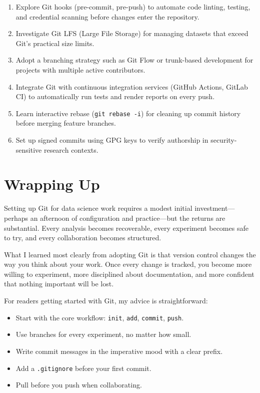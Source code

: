 \documentclass[
  letterpaper,
  DIV=11,
  numbers=noendperiod]{scrartcl}
\providecommand{\tightlist}{%
  \setlength{\itemsep}{0pt}\setlength{\parskip}{0pt}}
\begin{document}
\begin{enumerate}
\def\labelenumi{\arabic{enumi}.}
\tightlist
\item
  Explore Git hooks (pre-commit, pre-push) to automate code linting,
  testing, and credential scanning before changes enter the repository.
\item
  Investigate Git LFS (Large File Storage) for managing datasets that
  exceed Git's practical size limits.
\item
  Adopt a branching strategy such as Git Flow or trunk-based development
  for projects with multiple active contributors.
\item
  Integrate Git with continuous integration services (GitHub Actions,
  GitLab CI) to automatically run tests and render reports on every
  push.
\item
  Learn interactive rebase (\texttt{git\ rebase\ -i}) for cleaning up
  commit history before merging feature branches.
\item
  Set up signed commits using GPG keys to verify authorship in
  security-sensitive research contexts.
\end{enumerate}

\section{Wrapping Up}\label{wrapping-up}

Setting up Git for data science work requires a modest initial
investment---perhaps an afternoon of configuration and practice---but
the returns are substantial. Every analysis becomes recoverable, every
experiment becomes safe to try, and every collaboration becomes
structured.

What I learned most clearly from adopting Git is that version control
changes the way you think about your work. Once every change is tracked,
you become more willing to experiment, more disciplined about
documentation, and more confident that nothing important will be lost.

For readers getting started with Git, my advice is straightforward:

\begin{itemize}
\tightlist
\item
  Start with the core workflow: \texttt{init}, \texttt{add},
  \texttt{commit}, \texttt{push}.
\item
  Use branches for every experiment, no matter how small.
\item
  Write commit messages in the imperative mood with a clear prefix.
\item
  Add a \texttt{.gitignore} before your first commit.
\item
  Pull before you push when collaborating.
\end{itemize}
\end{document}
